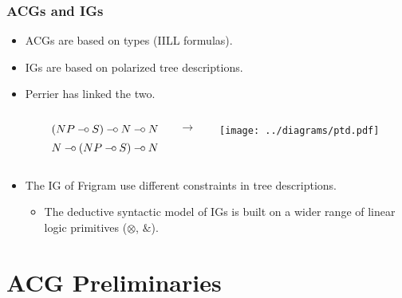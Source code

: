 \documentclass{beamer}
\def\limp {\mathbin{{-}\mkern-3.5mu{\circ}}}
\begin{document}
\begin{frame}
  \frametitle{ACGs and IGs}

  \begin{itemize}
  \item ACGs are based on types (IILL formulas).
  \item IGs are based on polarized tree descriptions.
  \item Perrier has linked the two.

    \vspace{2 mm}
    \begin{columns}[c]
      \begin{column}{0.1\textwidth}\end{column}
      \begin{column}{0.4\textwidth}
        $$(NP \limp S) \limp N \limp N$$
        $$N \limp (NP \limp S) \limp N$$
      \end{column}
      \begin{column}{0.1\textwidth}$\to$\end{column}
      \begin{column}{0.2\textwidth}
        \texttt{[image: ../diagrams/ptd.pdf]}
      \end{column}
      \begin{column}{0.25\textwidth}\end{column}
    \end{columns}
  \item The IG of Frigram use different constraints in tree
    descriptions.
    \begin{itemize}
    \item The deductive syntactic model of IGs is built on a wider range
      of linear logic primitives ($\otimes$, $\&$).
    \end{itemize}
  \end{itemize}
\end{frame}


\section{ACG Preliminaries}

\newcommand{\synt}[1]{C_{\textrm{#1}}}
\end{document}
